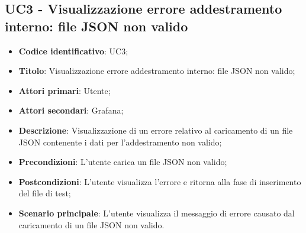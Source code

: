 \subsection{UC3 - Visualizzazione errore addestramento interno: file JSON non valido}
\begin{itemize}
	\item \textbf{Codice identificativo}: UC3;
	\item \textbf{Titolo}: Visualizzazione errore addestramento interno: file JSON non valido;
	\item \textbf{Attori primari}: Utente;
	\item \textbf{Attori secondari}: Grafana\glo;
	\item \textbf{Descrizione}: Visualizzazione di un errore relativo al caricamento di un file JSON contenente i dati per l'addestramento non valido;
	\item \textbf{Precondizioni}: L'utente carica un file JSON non valido;
	\item \textbf{Postcondizioni}: L'utente visualizza l'errore e ritorna alla fase di inserimento del file di test;	
	\item \textbf{Scenario principale}: L'utente visualizza il messaggio di errore causato dal caricamento di un file JSON non valido.	
\end{itemize}
